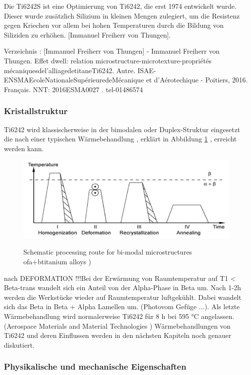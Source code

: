 Die Ti6242S ist eine Optimierung von Ti6242, die erst 1974 entwickelt wurde. Dieser wurde zusätzlich Silizium in kleinen Mengen zulegiert, um die Resistenz gegen Kriechen vor allem bei hohen Temperaturen durch die Bildung von Siliziden zu erhöhen.  [Immanuel Freiherr von Thungen]. 

Verzeichnis : [Immanuel Freiherr von Thungen] - Immanuel Freiherr von Thungen. Effet dwell: relation microstructure-microtexture-propriétés mécaniquesdel’alliagedetitaneTi6242. Autre. ISAE-ENSMAEcoleNationaleSupérieuredeMécanique et d’Aérotechique - Poitiers, 2016. Français. NNT: 2016ESMA0027 .  tel-01486574
\subsubsection{Kristallstruktur}

Ti6242 wird klassischerweise in der bimodalen oder Duplex-Struktur eingesetzt die nach einer typischen Wärmebehandlung , erklärt in Abbildung \ref{WB} , erreicht  werden kann.

\begin{figure}[H]
	
	\centering
	
	{\includegraphics[width=1\textwidth]{Bilder/WB}}			
	\caption{Schematic processing route for bi-modal microstructures ofa+btitanium alloys )}
	\label{WB}
\end{figure}
nach DEFORMATION !!!Bei der Erwärmung von Raumtemperatur  auf T1 < Beta-trans wandelt sich ein Anteil von der Alpha-Phase in Beta um. Nach 1-2h werden die Werkstücke wieder auf Raumtemperatur luftgekühlt.
Dabei wandelt sich das Beta in Beta + Alpha Lamellen um. (Photovom Gefüge ...).
Als letzte Wärmebehandlung wird normalerweise  Ti6242 für  8 h  bei 595 °C angelassen. (Aerospace Materials and Material Technologies )
Wärmebehandlungen von Ti6242 und deren Einflussen werden in den nächsten Kapiteln noch genauer diskutiert.


\subsubsection{ Physikalische und mechanische Eigenschaften }

